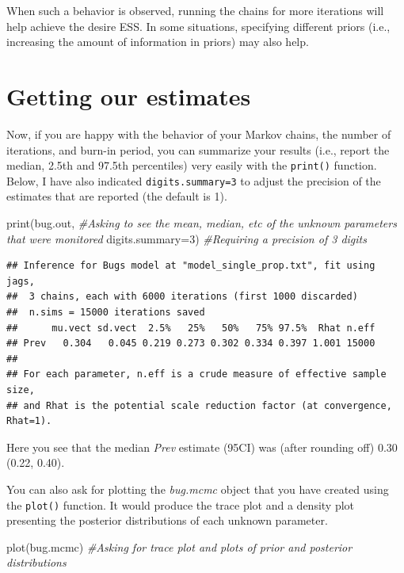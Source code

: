 \documentclass[
]{book}
\newenvironment{Shaded}{\begin{snugshade}}{\end{snugshade}}
\newcommand{\AttributeTok}[1]{\textcolor[rgb]{0.77,0.63,0.00}{#1}}
\newcommand{\CommentTok}[1]{\textcolor[rgb]{0.56,0.35,0.01}{\textit{#1}}}
\newcommand{\DecValTok}[1]{\textcolor[rgb]{0.00,0.00,0.81}{#1}}
\newcommand{\FunctionTok}[1]{\textcolor[rgb]{0.00,0.00,0.00}{#1}}
\newcommand{\NormalTok}[1]{#1}
\begin{document}
When such a behavior is observed, running the chains for more iterations
will help achieve the desire ESS. In some situations, specifying
different priors (i.e., increasing the amount of information in priors)
may also help.

\hypertarget{getting-our-estimates}{%
\section{Getting our estimates}\label{getting-our-estimates}}

Now, if you are happy with the behavior of your Markov chains, the
number of iterations, and burn-in period, you can summarize your results
(i.e., report the median, 2.5th and 97.5th percentiles) very easily with
the \texttt{print()} function. Below, I have also indicated
\texttt{digits.summary=3} to adjust the precision of the estimates that
are reported (the default is 1).

\begin{Shaded}
\begin{Highlighting}[]
\FunctionTok{print}\NormalTok{(bug.out,                  }\CommentTok{\#Asking to see the mean, median, etc of the unknown parameters that were monitored}
      \AttributeTok{digits.summary=}\DecValTok{3}\NormalTok{)         }\CommentTok{\#Requiring a precision of 3 digits}
\end{Highlighting}
\end{Shaded}

\begin{verbatim}
## Inference for Bugs model at "model_single_prop.txt", fit using jags,
##  3 chains, each with 6000 iterations (first 1000 discarded)
##  n.sims = 15000 iterations saved
##      mu.vect sd.vect  2.5%   25%   50%   75% 97.5%  Rhat n.eff
## Prev   0.304   0.045 0.219 0.273 0.302 0.334 0.397 1.001 15000
## 
## For each parameter, n.eff is a crude measure of effective sample size,
## and Rhat is the potential scale reduction factor (at convergence, Rhat=1).
\end{verbatim}

Here you see that the median \emph{Prev} estimate (95CI) was (after
rounding off) 0.30 (0.22, 0.40).

You can also ask for plotting the \emph{bug.mcmc} object that you have
created using the \texttt{plot()} function. It would produce the trace
plot and a density plot presenting the posterior distributions of each
unknown parameter.

\begin{Shaded}
\begin{Highlighting}[]
\FunctionTok{plot}\NormalTok{(bug.mcmc)              }\CommentTok{\#Asking for trace plot and plots of prior and posterior distributions}
\end{Highlighting}
\end{Shaded}
\end{document}
